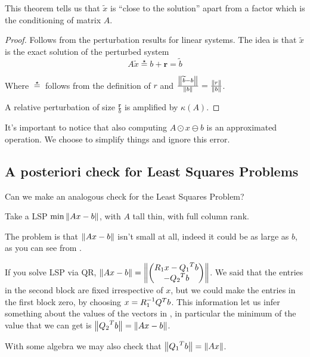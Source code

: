 \documentclass[ComputationalMathematics.tex]{subfiles}
\begin{document}
This theorem tells us that $\widetilde{x}$ is ``close to the solution'' apart from a factor which is the conditioning of matrix $A$.

\begin{proof}
Follows from the perturbation results for linear systems. The idea is that $\widetilde{x}$ is the exact solution of the perturbed system 
\[
  A\widetilde{x} \stareq b + \mathbf{r} = \widetilde{b}
\]

Where $\stareq$ follows from the definition of $r$ and $\frac{\left\lVert\widetilde{b} - b\right\rVert}{\left\lVert b\right\rVert} = \frac{\left\lVert r\right\rVert}{\left\lVert b\right\rVert}$.

  A relative perturbation of size $\frac{\mathbf{r}}{b}$ is amplified by $\kappa(A)$.
\end{proof}

It's important to notice that also computing $A \odot x \ominus b$ is an approximated operation. We choose to simplify things and ignore this error.

\subsection{A posteriori check for Least Squares Problems}
Can we make an analogous check for the Least Squares Problem?

  Take a LSP $\min \left\lVert Ax-b\right\rVert$, with $A$ tall thin, with full column rank.

  The problem is that $\left\lVert Ax - b\right\rVert$ isn't small at all, indeed it could be as large as $b$, as you can see from .


  \begin{obs}
    If you solve LSP via QR, $\left\lVert Ax - b\right\rVert = \left\lVert\begin{pmatrix} 
    R_1 x - {Q_1}^{T}b\\ -{Q_2}^{T} b \end{pmatrix}\right\rVert$. We said that the entries in the second block are fixed irrespective of $x$, but we could make the entries in the first block zero, by choosing $x=R_1^{-1}{Q}^{T}b$. This information let us infer something about the values of the vectors in , in particular the minimum of the value that we can get is $\left\lVert{Q_2}^{T} b\right\rVert = \left\lVert Ax - b\right\rVert$.

    With some algebra we may also check that $\left\lVert{Q_1}^{T} b\right\rVert = \left\lVert Ax\right\rVert$.
  \end{obs}
\end{document}
